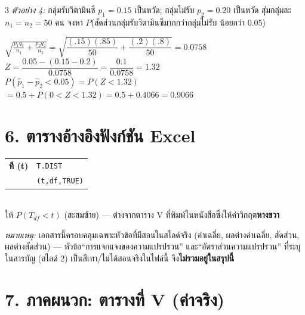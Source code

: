 \documentclass[9pt]{extarticle}
\begin{document}
\begin{multicols}{3}
\textit{ตัวอย่าง 4:} กลุ่มรับวิตามินซี $p_1{=}0.15$ เป็นหวัด; กลุ่มไม่รับ $p_2{=}0.20$ เป็นหวัด สุ่มกลุ่มละ $n_1{=}n_2{=}50$ คน จงหา $P$(สัดส่วนกลุ่มรับวิตามินซีมากกว่ากลุ่มไม่รับ น้อยกว่า 0.05)
\begin{solbox}
$\sqrt{\frac{p_1q_1}{n_1}{+}\frac{p_2q_2}{n_2}}=\sqrt{\dfrac{(.15)(.85)}{50}{+}\dfrac{(.2)(.8)}{50}}=0.0758$\\
$Z=\dfrac{0.05-(0.15-0.2)}{0.0758}=\dfrac{0.1}{0.0758}=1.32$\\
$P(\hat p_1-\hat p_2{<}0.05)=P(Z{<}1.32)$\\
$=0.5+P(0{<}Z{<}1.32)=0.5+0.4066=0.9066$
\end{solbox}

\section*{6. ตารางอ้างอิงฟังก์ชัน Excel}
\begin{formulabox}
\begin{tabular}{@{}ll@{}}
\textbf{ที (t)} & \texttt{T.DIST}\\
& \texttt{(t,df,TRUE)}\\
\end{tabular}\\[2pt]
\footnotesize ให้ $P(T_{df}<t)$ (สะสมซ้าย) — ต่างจากตาราง V ที่พิมพ์ในหนังสือซึ่งให้ค่าวิกฤต\textbf{หางขวา}
\end{formulabox}

\textit{หมายเหตุ:} เอกสารนี้\allowbreak ครอบคลุมเฉพาะหัวข้อที่มีสอนใน\allowbreak สไลด์จริง (ค่าเฉลี่ย, ผลต่างค่าเฉลี่ย, สัดส่วน, ผลต่างสัดส่วน) — หัวข้อ\allowbreak ``การแจกแจงของความแปรปรวน'' และ\allowbreak ``อัตราส่วนความแปรปรวน'' ที่ระบุใน\allowbreak สารบัญ (สไลด์ 2) เป็นสีเทา/\allowbreak ไม่ได้สอนจริงในไฟล์นี้ จึง\textbf{ไม่รวมอยู่ในสรุปนี้}

\end{multicols}
\newpage
\section*{7. ภาคผนวก: ตารางที่ V (ค่าจริง)}
\end{document}
